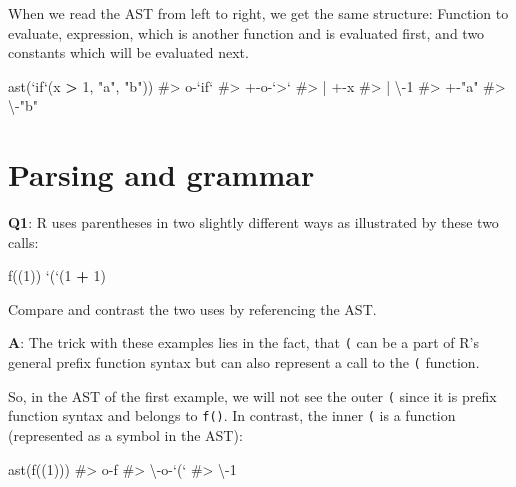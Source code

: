 \documentclass[
]{krantz}
\makeatletter
\newenvironment{Shaded}{\begin{snugshade}}{\end{snugshade}}
\newcommand{\CommentTok}[1]{\textcolor[rgb]{0.56,0.35,0.01}{\textit{#1}}}
\newcommand{\DataTypeTok}[1]{\textcolor[rgb]{0.13,0.29,0.53}{#1}}
\newcommand{\DecValTok}[1]{\textcolor[rgb]{0.00,0.00,0.81}{#1}}
\newcommand{\KeywordTok}[1]{\textcolor[rgb]{0.13,0.29,0.53}{\textbf{#1}}}
\newcommand{\NormalTok}[1]{#1}
\newcommand{\OperatorTok}[1]{\textcolor[rgb]{0.81,0.36,0.00}{\textbf{#1}}}
\newcommand{\StringTok}[1]{\textcolor[rgb]{0.31,0.60,0.02}{#1}}
\newenvironment{kframe}{%
\medskip{}
\setlength{\fboxsep}{.8em}
 \def\at@end@of@kframe{}%
 \ifinner\ifhmode%
  \def\at@end@of@kframe{\end{minipage}}%
  \begin{minipage}{\columnwidth}%
 \fi\fi%
 \def\FrameCommand##1{\hskip\@totalleftmargin \hskip-\fboxsep
 \colorbox{shadecolor}{##1}\hskip-\fboxsep
     \hskip-\linewidth \hskip-\@totalleftmargin \hskip\columnwidth}%
 \MakeFramed {\advance\hsize-\width
   \@totalleftmargin\z@ \linewidth\hsize
   \@setminipage}}%
 {\par\unskip\endMakeFramed%
 \at@end@of@kframe}
\renewenvironment{Shaded}{\begin{kframe}}{\end{kframe}}
\renewcommand{\KeywordTok} [1]{\textcolor[rgb]{0.00,0.44,0.13}{{#1}}}
\renewcommand{\DataTypeTok}[1]{\textcolor[rgb]{0.56,0.13,0.00}{{#1}}}
\renewcommand{\DecValTok}  [1]{\textcolor[rgb]{0.25,0.63,0.44}{{#1}}}
\renewcommand{\StringTok}  [1]{\textcolor[rgb]{0.25,0.44,0.63}{{#1}}}
\renewcommand{\CommentTok} [1]{\textcolor[rgb]{0.38,0.63,0.69}{{#1}}}
\renewcommand{\NormalTok}  [1]{{#1}}
\makeatother
\begin{document}
When we read the AST from left to right, we get the same structure: Function to evaluate, expression, which is another function and is evaluated first, and two constants which will be evaluated next.

\begin{Shaded}
\begin{Highlighting}[]
\KeywordTok{ast}\NormalTok{(}\StringTok{`}\DataTypeTok{if}\StringTok{`}\NormalTok{(x }\OperatorTok{>}\StringTok{ }\DecValTok{1}\NormalTok{, }\StringTok{"a"}\NormalTok{, }\StringTok{"b"}\NormalTok{))}
\CommentTok{#> o-`if` }
\CommentTok{#> +-o-`>` }
\CommentTok{#> | +-x }
\CommentTok{#> | \textbackslash{}-1 }
\CommentTok{#> +-"a" }
\CommentTok{#> \textbackslash{}-"b"}
\end{Highlighting}
\end{Shaded}

\hypertarget{parsing-and-grammar}{%
\section{Parsing and grammar}\label{parsing-and-grammar}}

\textbf{{Q1}}: R uses parentheses in two slightly different ways as illustrated by these two calls:

\begin{Shaded}
\begin{Highlighting}[]
\KeywordTok{f}\NormalTok{((}\DecValTok{1}\NormalTok{))}
\StringTok{`}\DataTypeTok{(}\StringTok{`}\NormalTok{(}\DecValTok{1} \OperatorTok{+}\StringTok{ }\DecValTok{1}\NormalTok{)}
\end{Highlighting}
\end{Shaded}

Compare and contrast the two uses by referencing the AST.

\textbf{{A}}: The trick with these examples lies in the fact, that \texttt{(} can be a part of R's general prefix function syntax but can also represent a call to the \texttt{(} function.

So, in the AST of the first example, we will not see the outer \texttt{(} since it is prefix function syntax and belongs to \texttt{f()}. In contrast, the inner \texttt{(} is a function (represented as a symbol in the AST):

\begin{Shaded}
\begin{Highlighting}[]
\KeywordTok{ast}\NormalTok{(}\KeywordTok{f}\NormalTok{((}\DecValTok{1}\NormalTok{)))}
\CommentTok{#> o-f }
\CommentTok{#> \textbackslash{}-o-`(` }
\CommentTok{#>   \textbackslash{}-1}
\end{Highlighting}
\end{Shaded}
\end{document}
